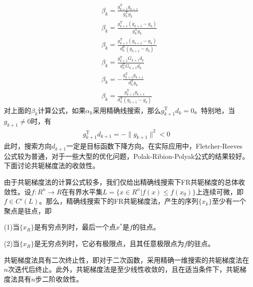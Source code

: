             \begin{align*}
            & {\beta}_{k}=\frac {g_{k+1}^\mathrm{T} g_{k+1}}{g_k^\mathrm{T} g_{k}}   \tag*{[Fletcher-Reeves公式]}\\
            & {\beta}_{k}=\frac {g_{k+1}^\mathrm{T} (g_{k+1}-g_k)}{g_k^\mathrm{T} g_{k}}  \tag*{[Polak-Ribion-Polyak公式]}\\
            & {\beta}_{k}=\frac {g_{k+1}^\mathrm{T} (g_{k+1}-g_k)}{d_k^\mathrm{T} (g_{k+1}-g_k)}  \tag*{[Growder-Wolfe公式]}\\
            & {\beta}_{k}=\frac {g_{k+1}^\mathrm{T} G_{k+1}d_k}{d_k^\mathrm{T} G_{k+1}d_{k}}  \tag*{[Doniel公式]}\\
            & {\beta}_{k}=-\frac {g_{k+1}^\mathrm{T} g_{k+1}}{d_k^\mathrm{T} g_{k}} \tag*{[Dixon公式]}\\
            & {\beta}_{k}=\frac {g_{k+1}^\mathrm{T} g_{k+1}}{d_k^\mathrm{T} (g_{k+1}-g_k)} \tag*{[Dai-Yuan公式]}
            \end{align*}
            对上面的${\beta}_{k}$计算公式，如果${\alpha}_{k}$采用精确线搜索，那么$g_{k+1}^\mathrm{T} d_k=0$。特别地，当$g_{k+1} \neq 0$时，有
            \begin{align*}
            g_{k+1}^\mathrm{T} d_{k+1}=-\|g_{k+1}\|^2 < 0
            \end{align*}
            此时，搜索方向$d_{k+1}$一定是目标函数下降方向。在实际应用中，Fletcher-Reeves公式较为普通，对于一些大型的优化问题，Polak-Ribion-Polyak公式的结果较好。下面讨论共轭梯度法的收敛性。
            \par
            由于共轭梯度法的计算公式较多，我们仅给出精确线搜索下FR共轭梯度的总体收敛性。设$f:R^n \to R$在有界水平集$L=\{x \in R^n |f(x) \leqslant f(x_0)\}$上连续可微，即$f \in C'(L)$。那么，精确线搜索下的FR共轭梯度法，产生的序列$\{x_k\}$至少有一个聚点是驻点，即\par
            (1)当$\{x_R\}$是有穷点列时，最后一个点$x^*$是$f$的驻点。\par
            (2)当$\{x_R\}$是无穷点列时，它必有极限点，且其任意极限点为$f$的驻点。\par
            共轭梯度法具有二次终止性，即对于二次函数，采用精确一维搜索的共轭梯度法在$n$次迭代后终止。此外，共轭梯度法是至少线性收敛的，且在适当条件下，共轭梯度法具有$n$步二阶收敛性。
